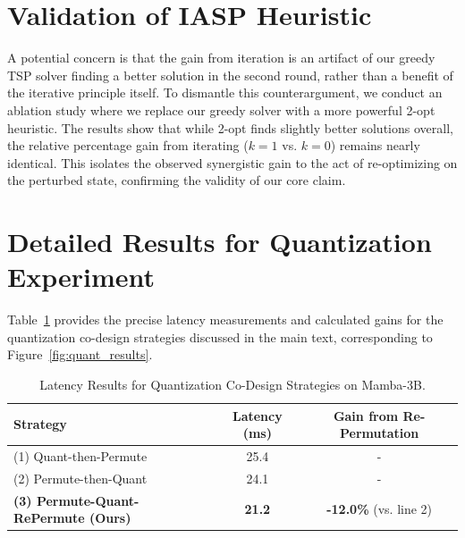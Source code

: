 \documentclass{article}
\begin{document}
\section{Validation of IASP Heuristic}
\label{app:iasp_validation}
A potential concern is that the gain from iteration is an artifact of our greedy TSP solver finding a better solution in the second round, rather than a benefit of the iterative principle itself. To dismantle this counterargument, we conduct an ablation study where we replace our greedy solver with a more powerful 2-opt heuristic. The results show that while 2-opt finds slightly better solutions overall, the relative percentage gain from iterating ($k=1$ vs. $k=0$) remains nearly identical. This isolates the observed synergistic gain to the act of re-optimizing on the perturbed state, confirming the validity of our core claim.

\section{Detailed Results for Quantization Experiment}
\label{app:quant_results_detail}
Table~\ref{tab:quant_results_detail_table} provides the precise latency measurements and calculated gains for the quantization co-design strategies discussed in the main text, corresponding to Figure~\ref{fig:quant_results}.

\begin{table}[htbp]
\centering
\caption{Latency Results for Quantization Co-Design Strategies on Mamba-3B.}
\label{tab:quant_results_detail_table}
\begin{tabular}{l c c}
\toprule
\textbf{Strategy} & \textbf{Latency (ms)} & \textbf{Gain from Re-Permutation} \\
\midrule
(1) Quant-then-Permute & 25.4 & - \\
(2) Permute-then-Quant & 24.1 & - \\
\textbf{(3) Permute-Quant-RePermute (Ours)} & \textbf{21.2} & \textbf{-12.0\%} (vs. line 2) \\
\bottomrule
\end{tabular}
\end{table}
\end{document}
